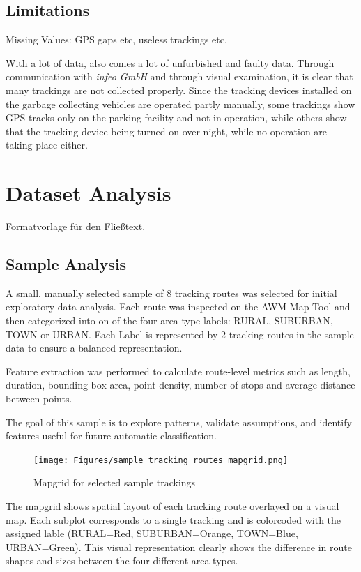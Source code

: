 \documentclass[a4paper,12pt,twoside]{scrreprt}
\begin{document}
\subsection{Limitations}
Missing Values: GPS gaps etc, useless trackings etc.

With a lot of data, also comes a lot of unfurbished and faulty data. Through
communication with
\textit{infeo GmbH} and through visual examination, it is clear that many
trackings are not collected properly.
Since the tracking devices installed on the garbage collecting vehicles are
operated partly manually,
some trackings show GPS tracks only on the parking facility and not in
operation,
while others show that the tracking device being turned on over night, while
no
operation are taking place either.

\section{Dataset Analysis}
Formatvorlage für den Fließtext.

\subsection{Sample Analysis}

A small, manually selected sample of 8 tracking routes was selected for initial
exploratory data analysis. Each route was inspected on the AWM-Map-Tool and
then categorized into on of the four area type labels: RURAL, SUBURBAN, TOWN or
URBAN. Each Label is represented by 2 tracking routes in the sample data to
ensure a balanced representation.

Feature extraction was performed to calculate route-level metrics such as
length, duration, bounding box area, point density, number of stops and average
distance between points.

The goal of this sample is to explore patterns, validate assumptions, and
identify features useful for future automatic classification.

\begin{figure}[htbp]
  \centering

  \texttt{[image: Figures/sample\_tracking\_routes\_mapgrid.png]}
  \caption{Mapgrid for selected sample trackings}
  \label{fig:sample_mapgrid}
\end{figure}
\FloatBarrier
The mapgrid shows spatial layout of each tracking route overlayed on a visual
map. Each subplot corresponds to a single tracking and is colorcoded with the
assigned lable (RURAL=Red, SUBURBAN=Orange, TOWN=Blue, URBAN=Green). This
visual representation clearly shows the difference in route shapes and sizes
between the four different area types.
\end{document}
